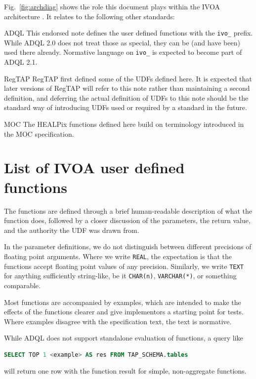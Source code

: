 \documentclass[11pt,a4paper]{ivoa}
\begin{document}
Fig.~\ref{fig:archdiag} shows the role this document plays within the
IVOA architecture \citep{2021ivoa.spec.1101D}.  It relates to the following
other standards:

\begin{bigdescription}
\item[ADQL \citep{2008ivoa.spec.1030O}] This endorsed note defines the
user defined functions with the \verb|ivo_| prefix.  While ADQL 2.0
does not treat those as special, they can be (and have been) used there
already.  Normative language on \verb|ivo_| is expected to become
part of ADQL 2.1.

\item[RegTAP \citep{2019ivoa.spec.1011D}] RegTAP first defined some of the
UDFs defined here.  It is expected that later versions of RegTAP will
refer to this note rather than maintaining a second definition, and
deferring the actual definition of UDFs to this note should be the
standard way of introducing UDFs used or required by a standard in the future.

\item[MOC \citep{2019ivoa.spec.1007F}] The HEALPix functions defined
here build on terminology introduced in the MOC specification.
\end{bigdescription}


\section{List of IVOA user defined functions}

The functions are defined through a brief human-readable description of
what the function does, followed by a closer discussion of the
parameters, the return value, and the authority the UDF was drawn from.

In the parameter definitions, we do not distinguish between different
precisions of floating point arguments.  Where we write \texttt{REAL}, the
expectation is that the functions accept floating point values of any
precision.  Similarly, we write \texttt{TEXT} for anything sufficiently
string-like, be it \texttt{CHAR(n)}, \texttt{VARCHAR(*)}, or something
comparable.

Most functions are accompanied by examples, which are intended to make
the effects of the functions clearer and give implementors a
starting point for tests.  Where examples disagree with the
specification text, the text is normative.

While ADQL does not support standalone evaluation of functions, a query
like
\begin{lstlisting}[language=SQL,aboveskip=\medskipamount]
  SELECT TOP 1 <example> AS res FROM TAP_SCHEMA.tables
\end{lstlisting}
will return one row with the function result for simple, non-aggregate
functions.
\end{document}

